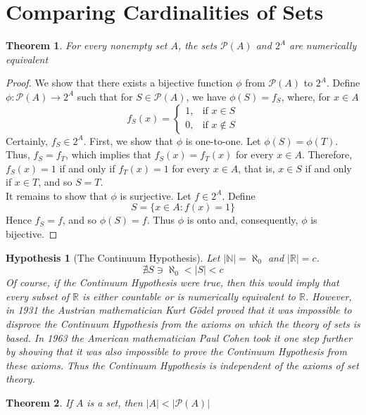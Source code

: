 \documentclass[10pt]{report}
\newtheorem{hyp1}{Hypothesis}[chapter]
\newtheorem{thm2}{Theorem}[section]
\begin{document}
\section{Comparing Cardinalities of Sets}
\begin{thm2}
For every nonempty set $A$, the sets $\mathcal{P}(A)$ and $2^A$ are numerically equivalent
\end{thm2}
\begin{proof}
We show that there exists a bijective function $\phi$ from $\mathcal{P}(A)$ to $2^A$. Define $\phi: \mathcal{P}(A)\to 2^A$ such that for $S\in \mathcal{P}(A)$, we have $\phi (S)=f_S$, where, for $x\in A$
$$f_S(x)=
\begin{cases}
1, & \text{if }x\in S \\
0, & \text{if }x\notin S
\end{cases}$$
Certainly, $f_S\in 2^A$. First, we show that $\phi$ is one-to-one. Let $\phi (S)=\phi (T)$. Thus, $f_S=f_T$, which implies that $f_S(x)=f_T(x)$ for every $x\in A$. Therefore, $f_S(x)=1$ if and only if $f_T(x)=1$ for every $x\in A$, that is, $x\in S$ if and only if $x\in T$, and so $S=T$.\\
It remains to show that $\phi$ is surjective. Let $f\in 2^A$. Define
$$S=\{x\in A: f(x)=1\}$$
Hence $f_S=f$, and so $\phi(S)=f$. Thus $\phi$ is onto and, consequently, $\phi$ is bijective.
\end{proof}
\begin{hyp1}[The Continuum Hypothesis]
Let $|\mathbb{N}|=\aleph_0$ and $|\mathbb{R}|=c$. $$\nexists S \ni \aleph_0 < |S| < c $$
Of course, if the Continuum Hypothesis were true, then this would imply that every subset of $\mathbb{R}$ is either countable or is numerically equivalent to $\mathbb{R}$. However, in 1931 the Austrian mathematician Kurt G\"{o}del proved that it was impossible to disprove the Continuum Hypothesis from the axioms on which the theory of sets is based. In 1963 the American mathematician Paul Cohen took it one step further by showing that it was also impossible to \textit{prove} the Continuum Hypothesis from these axioms. Thus the Continuum Hypothesis is independent of the axioms of set theory.
\end{hyp1}
\begin{thm2}
If $A$ is a set, then $|A|<|\mathcal{P}(A)|$
\end{thm2}
\end{document}
